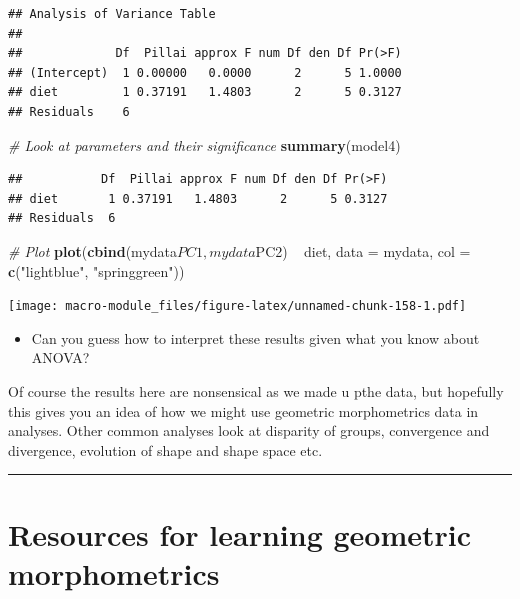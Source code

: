 \documentclass[]{book}
\newenvironment{Shaded}{\begin{snugshade}}{\end{snugshade}}
\newcommand{\KeywordTok}[1]{\textcolor[rgb]{0.13,0.29,0.53}{\textbf{{#1}}}}
\newcommand{\DataTypeTok}[1]{\textcolor[rgb]{0.13,0.29,0.53}{{#1}}}
\newcommand{\StringTok}[1]{\textcolor[rgb]{0.31,0.60,0.02}{{#1}}}
\newcommand{\CommentTok}[1]{\textcolor[rgb]{0.56,0.35,0.01}{\textit{{#1}}}}
\newcommand{\NormalTok}[1]{{#1}}
\providecommand{\tightlist}{%
  \setlength{\itemsep}{0pt}\setlength{\parskip}{0pt}}
\begin{document}
\begin{verbatim}
## Analysis of Variance Table
## 
##             Df  Pillai approx F num Df den Df Pr(>F)
## (Intercept)  1 0.00000   0.0000      2      5 1.0000
## diet         1 0.37191   1.4803      2      5 0.3127
## Residuals    6
\end{verbatim}

\begin{Shaded}
\begin{Highlighting}[]
\CommentTok{# Look at parameters and their significance}
\KeywordTok{summary}\NormalTok{(model4)}
\end{Highlighting}
\end{Shaded}

\begin{verbatim}
##           Df  Pillai approx F num Df den Df Pr(>F)
## diet       1 0.37191   1.4803      2      5 0.3127
## Residuals  6
\end{verbatim}

\begin{Shaded}
\begin{Highlighting}[]
\CommentTok{# Plot }
\KeywordTok{plot}\NormalTok{(}\KeywordTok{cbind}\NormalTok{(mydata$PC1,mydata$PC2) ~}\StringTok{ }\NormalTok{diet, }\DataTypeTok{data =} \NormalTok{mydata, }\DataTypeTok{col =} \KeywordTok{c}\NormalTok{(}\StringTok{"lightblue"}\NormalTok{, }\StringTok{"springgreen"}\NormalTok{))}
\end{Highlighting}
\end{Shaded}

\texttt{[image: macro-module\_files/figure-latex/unnamed-chunk-158-1.pdf]}

\begin{itemize}
\tightlist
\item
  Can you guess how to interpret these results given what you know about
  ANOVA?
\end{itemize}

Of course the results here are nonsensical as we made u pthe data, but
hopefully this gives you an idea of how we might use geometric
morphometrics data in analyses. Other common analyses look at disparity
of groups, convergence and divergence, evolution of shape and shape
space etc.

\begin{center}\rule{0.5\linewidth}{\linethickness}\end{center}

\section{Resources for learning geometric
morphometrics}\label{resources-for-learning-geometric-morphometrics}
\end{document}
